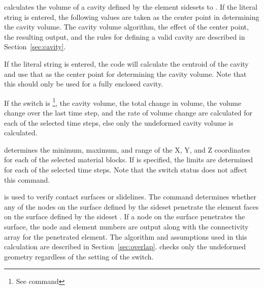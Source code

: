  {
 calculates the volume of a cavity defined by the element
sidesets  to .  If the literal string
 is entered, the following values are taken as the
center point in determining the cavity volume. The cavity volume
algorithm, the effect of the center point, the resulting output, and the
rules for defining a valid cavity are described in
Section~\ref{sec:cavity}. 

If the literal string  is entered, the code will
calculate the centroid of the cavity and use that as the center point
for determining the cavity volume. Note that this should only be used
for a fully enclosed cavity.

If the  switch is \footnote{See command
}, the cavity volume, the total change in volume, the volume
change over the last time step, and the rate of volume change are
calculated for each of the selected time steps, else only the undeformed
cavity volume is calculated. 
}

 {
 determines the minimum, maximum, and range of the 
X, Y, and Z coordinates for each of the selected material blocks.
If  is specified, the limits are determined for each of
the selected time steps.  Note that the  switch status does
not affect this command.
}

 {
 is used to verify contact surfaces or slidelines.  The
command determines whether any of the nodes on the surface defined by
the sideset  penetrate the element faces on the surface
defined by the sideset .  If a node on the
 surface penetrates the  surface, the
node and element numbers are output along with the connectivity array
for the penetrated element. The algorithm and assumptions used in this
calculation are described in Section~\ref{sec:overlap}.  
checks only the undeformed geometry regardless of the setting of the
 switch. 
}

